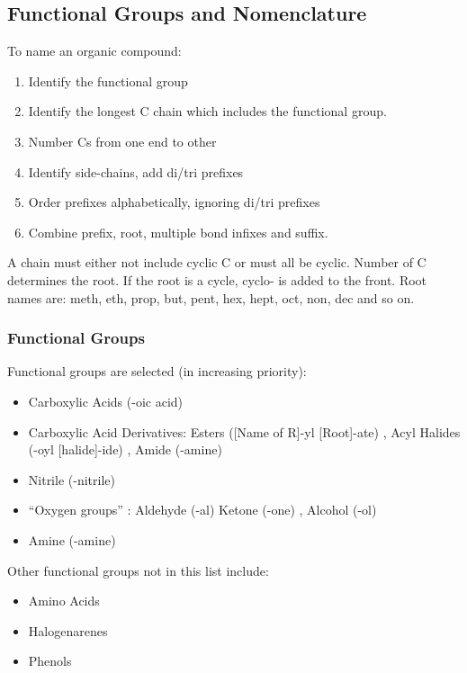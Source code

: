 \documentclass[../main]{subfiles}
\begin{document}
	\subsection{Functional Groups and Nomenclature}

	To name an organic compound:

	\begin{enumerate}
		\item Identify the functional group 
		\item Identify the longest C chain which includes the functional group.
		\item Number Cs from one end to other
		\item Identify side-chains, add di/tri prefixes
		\item Order prefixes alphabetically, ignoring di/tri prefixes
		\item Combine prefix, root, multiple bond infixes and suffix.
	\end{enumerate}

	A chain must either not include cyclic C or must all be cyclic. Number of C determines the root. If the root is a cycle, cyclo- is added to the front. Root names are: meth, eth, prop, but, pent, hex, hept, oct, non, dec and so on. \\

	\subsubsection{Functional Groups}

	Functional groups are selected (in increasing priority):
	\begin{itemize}
		\item Carboxylic Acids (-oic acid) 
		\item Carboxylic Acid Derivatives: Esters ([Name of R]-yl [Root]-ate) , Acyl Halides (-oyl [halide]-ide) , Amide (-amine) 
		\item Nitrile (-nitrile) 
		\item ``Oxygen groups'' : Aldehyde (-al)  Ketone (-one)  , Alcohol (-ol) 
		\item Amine (-amine) 
	\end{itemize}

	Other functional groups not in this list include:

	\begin{itemize}
		\item Amino Acids
		\item Halogenarenes
		\item Phenols
	\end{itemize}
\end{document}
